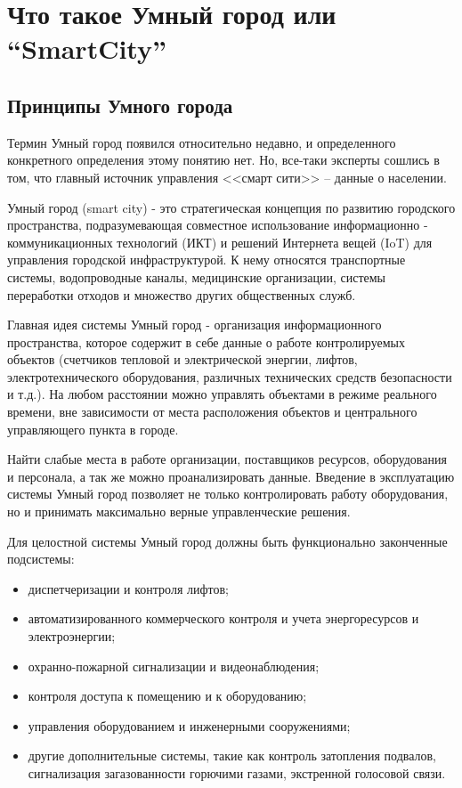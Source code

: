 
\section{Что такое Умный город или “SmartCity”}

\subsection{Принципы Умного города}

Термин Умный город появился относительно недавно, и определенного конкретного определения этому понятию нет. Но, все-таки  эксперты сошлись в том, что главный источник управления <<смарт сити>> – данные о населении. 

Умный город (smart city) - это стратегическая концепция по развитию городского пространства, подразумевающая совместное использование информационно - коммуникационных технологий (ИКТ) и решений Интернета вещей (IoT) для управления городской инфраструктурой. К нему относятся транспортные системы, водопроводные каналы, медицинские организации, системы переработки отходов и множество других общественных служб. 

Главная идея системы Умный город - организация информационного пространства, которое содержит в себе данные о работе контролируемых объектов (счетчиков тепловой и электрической энергии, лифтов, электротехнического оборудования, различных технических средств безопасности и т.д.). На любом расстоянии можно управлять объектами в режиме реального времени, вне зависимости от места расположения объектов и центрального управляющего пункта в городе.\cite{NK}

Найти слабые места в работе организации, поставщиков ресурсов, оборудования и персонала, а так же можно проанализировать данные. Введение в эксплуатацию системы Умный город позволяет не только контролировать работу оборудования, но и принимать максимально верные управленческие решения. 

Для целостной системы Умный город должны быть функционально законченные подсистемы:
\begin{itemize}
 \item диспетчеризации и контроля лифтов; 
 \item автоматизированного коммерческого контроля и учета энергоресурсов и электроэнергии; 
 \item охранно-пожарной сигнализации и видеонаблюдения; 
 \item контроля доступа к помещению и к оборудованию; 
 \item управления оборудованием и инженерными сооружениями; 
 \item другие дополнительные системы, такие как контроль затопления подвалов, сигнализация загазованности горючими газами, экстренной голосовой связи.
\end{itemize}
 
